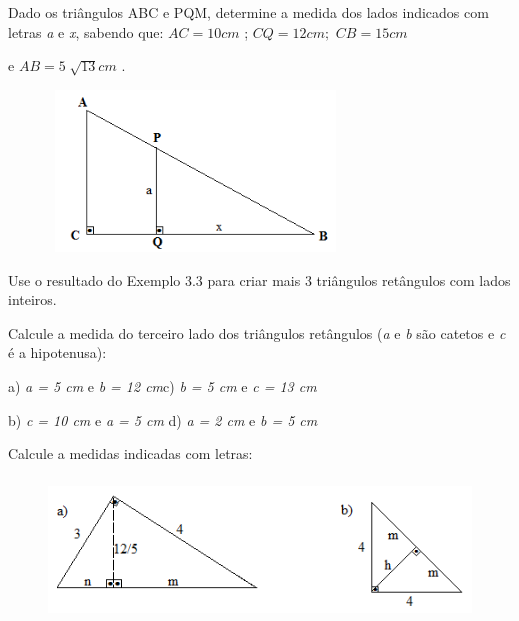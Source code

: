 \begin{exercicios}

\exitem{} Dado os triângulos ABC e PQM, determine a medida dos lados indicados com letras \textit{a} e \textit{x}, sabendo que:  \( AC=10 cm \) ; \(  CQ=12 cm; \)    \( CB=15 cm \)  

 e   \( AB=5\sqrt[]{13} cm \) .

\begin{figure}[H]
    \begin{Center}
        \includegraphics[width=3.07in,height=1.69in]{capitulos/trigonometria_e_funcoes_trigonometricas/media/image14.png}
    \end{Center}
\end{figure}

\exitem{} Use o resultado do Exemplo 3.3 para criar mais 3 triângulos retângulos com lados inteiros.

\exitem{} Calcule a medida do terceiro lado dos triângulos retângulos (\textit{a }e \textit{b} são catetos e \textit{c} é a hipotenusa):

a) \textit{a = 5 cm  }e\textit{ b = 12 cm\tab \tab \tab }c) \textit{b = 5 cm  }e\textit{ c = 13 cm}   \tab

b) \textit{c = 10 cm  }e\textit{ a = 5 cm}  \tab \tab d) \textit{a = 2 cm  }e\textit{ b = 5 cm} 

\exitem{} Calcule a medidas indicadas com letras:

\begin{figure}[H]
    \begin{Center}
        \includegraphics[width=4.96in,height=1.49in]{capitulos/trigonometria_e_funcoes_trigonometricas/media/image15.png}
    \end{Center}
\end{figure}


\end{exercicios}
